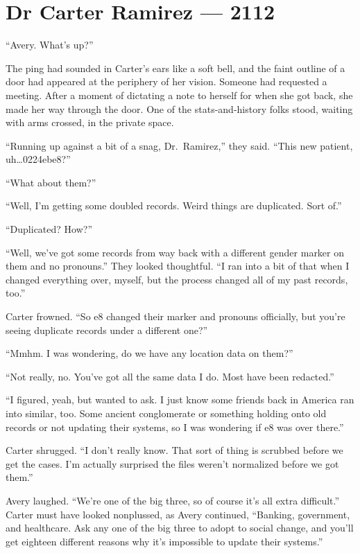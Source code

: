 \hypertarget{dr-carter-ramirez-2112}{%
\chapter*{Dr Carter Ramirez — 2112}\label{dr-carter-ramirez-2112}}

``Avery. What's up?''

The ping had sounded in Carter's ears like a soft bell, and the faint outline of a door had appeared at the periphery of her vision. Someone had requested a meeting. After a moment of dictating a note to herself for when she got back, she made her way through the door. One of the stats-and-history folks stood, waiting with arms crossed, in the private space.

``Running up against a bit of a snag, Dr.~Ramirez,'' they said. ``This new patient, uh\ldots{}0224ebe8?''

``What about them?''

``Well, I'm getting some doubled records. Weird things are duplicated. Sort of.''

``Duplicated? How?''

``Well, we've got some records from way back with a different gender marker on them and no pronouns.'' They looked thoughtful. ``I ran into a bit of that when I changed everything over, myself, but the process changed all of my past records, too.''

Carter frowned. ``So e8 changed their marker and pronouns officially, but you're seeing duplicate records under a different one?''

``Mmhm. I was wondering, do we have any location data on them?''

``Not really, no. You've got all the same data I do. Most have been redacted.''

``I figured, yeah, but wanted to ask. I just know some friends back in America ran into similar, too. Some ancient conglomerate or something holding onto old records or not updating their systems, so I was wondering if e8 was over there.''

Carter shrugged. ``I don't really know. That sort of thing is scrubbed before we get the cases. I'm actually surprised the files weren't normalized before we got them.''

Avery laughed. ``We're one of the big three, so of course it's all extra difficult.'' Carter must have looked nonplussed, as Avery continued, ``Banking, government, and healthcare. Ask any one of the big three to adopt to social change, and you'll get eighteen different reasons why it's impossible to update their systems.''

